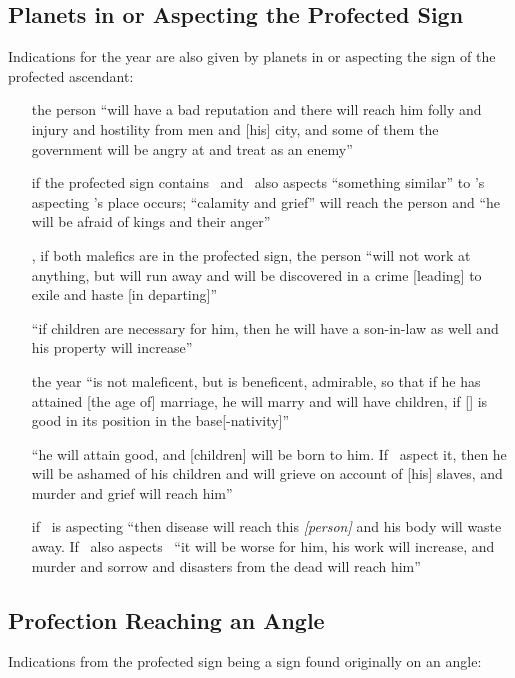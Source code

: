 \subsection{Planets in or Aspecting the Profected Sign}
Indications for the year are also given by planets in or aspecting the sign of the profected ascendant:
\begin{itemize}[topsep=0em,itemsep=0em]
\item[\Saturn]  the person ``will have a bad reputation and there will reach him folly and injury and hostility from men and [his] city, and some of them the government will be angry at and treat as an enemy'' 

\item[\Mars]  if the profected sign contains \Mars\, and \Saturn\, also aspects ``something similar'' to \Mars's aspecting \Saturn's place occurs; ``calamity and grief'' will reach the person and ``he will be afraid of kings and their anger''

\item[\Saturn,\Mars]  if both malefics are in the profected sign, the person ``will not work at anything, but will run away and will be discovered in a crime [leading] to exile and haste [in departing]''

\item[\Jupiter]  ``if children are necessary for him, then he will have a son-in-law as well and his property will increase''

\item[\Venus]  the year ``is not maleficent, but is beneficent, admirable, so that if he has attained [the age of] marriage, he will marry and will have children, if [\Venus] is good in its position in the base[-nativity]''

\item[\Mercury]  ``he will attain good, and [children] will be born to him. If \Saturn\, aspect it, then he will be ashamed of his children and will grieve on account of [his] slaves, and murder and grief will reach him''

\item[\Moon]  if \Saturn\, is aspecting ``then disease will reach this \textsl{[person]} and his body will waste away. If \Mercury\, also aspects \Saturn\, ``it will be worse for him, his work will increase, and murder and sorrow and disasters from the dead will reach him''
\end{itemize}

\subsection{Profection Reaching an Angle}
Indications from the profected sign being a sign found originally on an angle:


